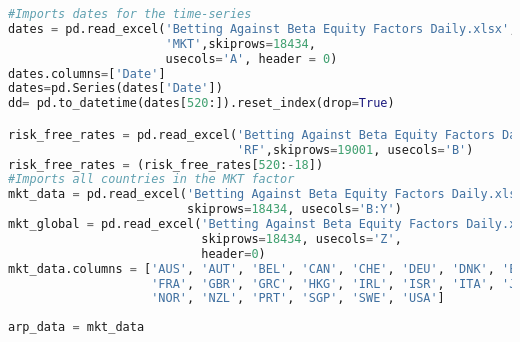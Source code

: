 \begin{lstlisting}[language=Python]
#Imports dates for the time-series
dates = pd.read_excel('Betting Against Beta Equity Factors Daily.xlsx',
                      'MKT',skiprows=18434,
                      usecols='A', header = 0)
dates.columns=['Date']
dates=pd.Series(dates['Date'])
dd= pd.to_datetime(dates[520:]).reset_index(drop=True)

risk_free_rates = pd.read_excel('Betting Against Beta Equity Factors Daily.xlsx',
                                'RF',skiprows=19001, usecols='B')
risk_free_rates = (risk_free_rates[520:-18])
#Imports all countries in the MKT factor
mkt_data = pd.read_excel('Betting Against Beta Equity Factors Daily.xlsx','MKT',
                         skiprows=18434, usecols='B:Y')
mkt_global = pd.read_excel('Betting Against Beta Equity Factors Daily.xlsx','MKT',
                           skiprows=18434, usecols='Z',
                           header=0)
mkt_data.columns = ['AUS', 'AUT', 'BEL', 'CAN', 'CHE', 'DEU', 'DNK', 'ESP', 'FIN',
                    'FRA', 'GBR', 'GRC', 'HKG', 'IRL', 'ISR', 'ITA', 'JPN', 'NLD', 
                    'NOR', 'NZL', 'PRT', 'SGP', 'SWE', 'USA']
\end{lstlisting}

\begin{lstlisting}[language=Python]
arp_data = mkt_data
\end{lstlisting}

